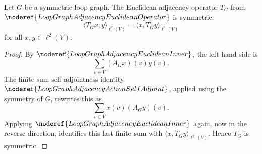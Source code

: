 \begin{helper}
Let \(G\) be a symmetric loop graph.  The Euclidean adjacency operator
\(T_G\) from \(\noderef{LoopGraphAdjacencyEuclideanOperator}\) is symmetric:
\[
  \langle T_Gx,y\rangle_{\ell^2(V)}
  =
  \langle x,T_Gy\rangle_{\ell^2(V)}
\]
for all \(x,y\in\ell^2(V)\).
\end{helper}
\begin{proof}
By \(\noderef{LoopGraphAdjacencyEuclideanInner}\), the left hand side is
\[
  \sum_{v\in V} (A_Gx)(v)y(v).
\]
The finite-sum self-adjointness identity
\(\noderef{LoopGraphAdjacencyActionSelfAdjoint}\), applied using the symmetry of
\(G\), rewrites this as
\[
  \sum_{v\in V} x(v)(A_Gy)(v).
\]
Applying \(\noderef{LoopGraphAdjacencyEuclideanInner}\) again, now in the
reverse direction, identifies this last finite sum with
\(\langle x,T_Gy\rangle_{\ell^2(V)}\).  Hence \(T_G\) is symmetric.
\end{proof}

